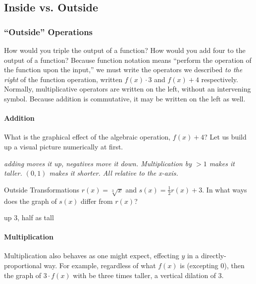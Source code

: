 \subsection{Inside vs. Outside}




\subsubsection{``Outside'' Operations}
How would you triple the output of a function?  How would you add four to the output of a function?
Because function notation means ``perform the operation of the function upon the input,'' we must
write the operators we described \emph{to the right} of the function operation, written $f(x) \cdot 3$
and $f(x) + 4$ respectively.  Normally, multiplicative operators are written on the left, without
an intervening symbol.  Because addition is commutative, it may be written on the left as well.

\paragraph{Addition}
What is the graphical effect of the algebraic operation, $f(x) + 4$?  Let us build up a visual picture
numerically at first.

\emph{adding moves it up, negatives move it down.  Multiplication by $>1$ makes it taller.
$(0,1)$ makes it shorter.  All relative to the x-axis.}

\begin{example}{Outside Transformations}
	\exProblem
$r(x)=\sqrt[3]{x}$ and $s(x)=\frac{1}{2}r(x)+3$.  In what ways does the graph of
$s(x)$ differ from $r(x)$?

	\exSolution
up 3, half as tall
\end{example}

\paragraph{Multiplication}
Multiplication also behaves as one might expect, effecting $y$ in a directly-proportional way.
For example, regardless of what $f(x)$ is (excepting 0), then the graph of $3\cdot{}f(x)$
with be three times taller, a vertical dilation of 3.

